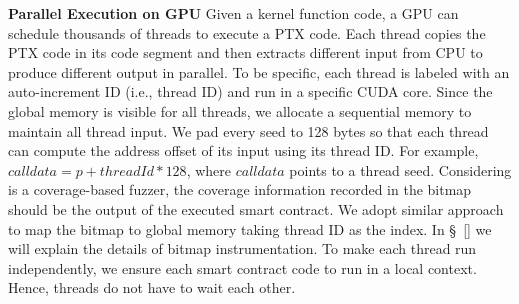 \noindent \textbf{Parallel Execution on GPU}
Given a kernel function code, a GPU can schedule thousands of threads to execute a PTX code. 
%
Each thread copies the PTX code in its code segment and then extracts different input from CPU to produce different output in parallel. 
To be specific, each thread is labeled with an auto-increment ID (i.e., thread ID) and run in a specific CUDA core. 
Since the global memory is visible for all threads, we allocate a sequential memory to maintain all thread input. We pad every seed to 128 bytes so that each thread can compute the address offset of its input using its thread ID. For example, $calldata = p + threadId * 128$, where $calldata$ points to a thread seed. 
Considering {\tool} is a coverage-based fuzzer, the coverage information recorded in the bitmap should be the output of the executed smart contract. 
We adopt similar approach to map the bitmap to global memory taking thread ID as the index. 
In \S~\ref{} we will explain the details of bitmap instrumentation. 
%
To make each thread run independently, we ensure each smart contract code to run in a local context. Hence, threads do not have to wait each other.
%



